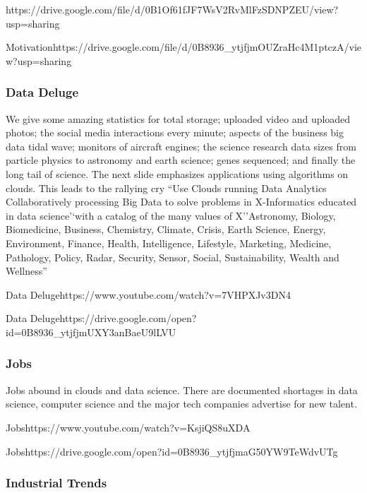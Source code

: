   {https://drive.google.com/file/d/0B1Of61fJF7WsV2RvMlFzSDNPZEU/view?usp=sharing}
  
  {Motivation}{https://drive.google.com/file/d/0B8936_ytjfjmOUZraHc4M1ptczA/view?usp=sharing}


\subsubsection{Data Deluge}\label{data-deluge}

We give some amazing statistics for total storage; uploaded video and
uploaded photos; the social media interactions every minute; aspects of
the business big data tidal wave; monitors of aircraft engines; the
science research data sizes from particle physics to astronomy and earth
science; genes sequenced; and finally the long tail of science. The next
slide emphasizes applications using algorithms on clouds. This leads to
the rallying cry ``Use Clouds running Data Analytics Collaboratively
processing Big Data to solve problems in X-Informatics educated in data
science'`with a catalog of the many values of X''Astronomy, Biology,
Biomedicine, Business, Chemistry, Climate, Crisis, Earth Science,
Energy, Environment, Finance, Health, Intelligence, Lifestyle,
Marketing, Medicine, Pathology, Policy, Radar, Security, Sensor, Social,
Sustainability, Wealth and Wellness''


  {Data Deluge}{https://www.youtube.com/watch?v=7VHPXJv3DN4}


  {Data  Deluge}{https://drive.google.com/open?id=0B8936_ytjfjmUXY3anBaeU9lLVU}

\subsubsection{Jobs}\label{jobs}

Jobs abound in clouds and data science. There are documented shortages
in data science, computer science and the major tech companies advertise
for new talent.


  {Jobs}{https://www.youtube.com/watch?v=KsjiQS8uXDA}


  {Jobs}{https://drive.google.com/open?id=0B8936_ytjfjmaG50YW9TeWdvUTg}


\subsubsection{Industrial Trends}\label{industrial-trends}

